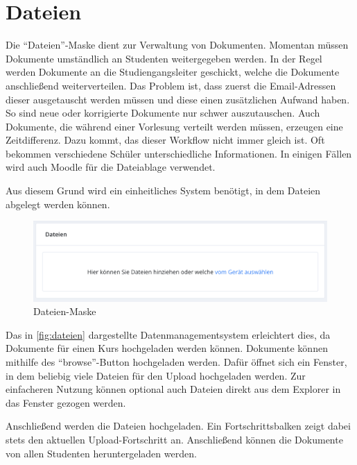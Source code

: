 



\section{Dateien}
Die \enquote{Dateien}-Maske dient zur Verwaltung von Dokumenten.
Momentan müssen Dokumente umständlich an Studenten weitergegeben werden.
In der Regel werden Dokumente an die Studiengangsleiter geschickt, welche die Dokumente anschließend weiterverteilen.
Das Problem ist, dass zuerst die Email-Adressen dieser ausgetauscht werden müssen und diese einen zusätzlichen Aufwand haben.
So sind neue oder korrigierte Dokumente nur schwer auszutauschen.
Auch Dokumente, die während einer Vorlesung verteilt werden müssen, erzeugen eine Zeitdifferenz.
Dazu kommt, das dieser Workflow nicht immer gleich ist.
Oft bekommen verschiedene Schüler unterschiedliche Informationen.
In einigen Fällen wird auch Moodle für die Dateiablage verwendet.

Aus diesem Grund wird ein einheitliches System benötigt, in dem Dateien abgelegt werden können.

\begin{figure}[h] 
    \centering
    \includegraphics[width=.7\textwidth]{img/Dateien_uebersicht.png}
    \caption{Dateien-Maske}
    \label{fig:dateien}
\end{figure}

Das in \autoref{fig:dateien} dargestellte Datenmanagementsystem erleichtert dies, da Dokumente für einen Kurs hochgeladen werden können.
Dokumente können mithilfe des \enquote{browse}-Button hochgeladen werden.
Dafür öffnet sich ein Fenster, in dem beliebig viele Dateien für den Upload hochgeladen werden.
Zur einfacheren Nutzung können optional auch Dateien direkt aus dem Explorer in das Fenster gezogen werden.

Anschließend werden die Dateien hochgeladen.
Ein Fortschrittsbalken zeigt dabei stets den aktuellen Upload-Fortschritt an.
Anschließend können die Dokumente von allen Studenten heruntergeladen werden.

